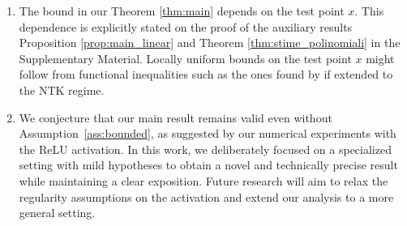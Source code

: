 \documentclass{article}
\theoremstyle{definition}
\theoremstyle{remark}
\numberwithin{equation}{section}
\begin{document}
\begin{enumerate}
        We would like to address this problem in future work.

    \item The bound in our Theorem \ref{thm:main} depends on the test point $x$.
    This dependence is explicitly stated on the proof of the auxiliary results Proposition \ref{prop:main_linear} and Theorem \ref{thm:stime_polinomiali} in the Supplementary Material.
    Locally uniform bounds on the test point $x$ might follow from functional inequalities such as the ones found by \cite{Favaro2025} if extended to the NTK regime.
    \item We conjecture that our main result remains valid even without Assumption~\ref{ass:bounded}, as suggested by our numerical experiments with the ReLU activation. 
    In this work, we deliberately focused on a specialized setting with mild hypotheses to obtain a novel and technically precise result while maintaining a clear exposition. 
    Future research will aim to relax the regularity assumptions on the activation and extend our analysis to a more general setting.
    

\end{enumerate}
\end{document}
